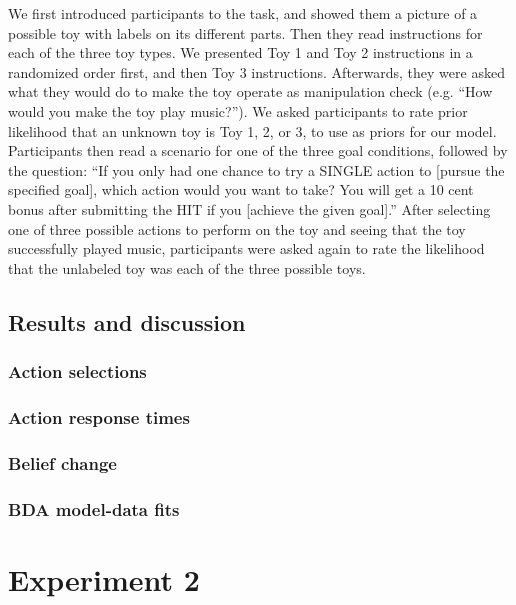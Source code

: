 \documentclass[10pt, letterpaper]{article}
\begin{document}
We first introduced participants to the task, and showed them a picture
of a possible toy with labels on its different parts. Then they read
instructions for each of the three toy types. We presented Toy 1 and Toy
2 instructions in a randomized order first, and then Toy 3 instructions.
Afterwards, they were asked what they would do to make the toy operate
as manipulation check (e.g. ``How would you make the toy play music?'').
We asked participants to rate prior likelihood that an unknown toy is
Toy 1, 2, or 3, to use as priors for our model. Participants then read a
scenario for one of the three goal conditions, followed by the question:
``If you only had one chance to try a SINGLE action to {[}pursue the
specified goal{]}, which action would you want to take? You will get a
10 cent bonus after submitting the HIT if you {[}achieve the given
goal{]}.'' After selecting one of three possible actions to perform on
the toy and seeing that the toy successfully played music, participants
were asked again to rate the likelihood that the unlabeled toy was each
of the three possible toys.

\subsection{Results and discussion}\label{results-and-discussion}

\subsubsection{Action selections}\label{action-selections}

\subsubsection{Action response times}\label{action-response-times}

\subsubsection{Belief change}\label{belief-change}

\subsubsection{BDA model-data fits}\label{bda-model-data-fits}

\section{Experiment 2}\label{experiment-2}
\end{document}
